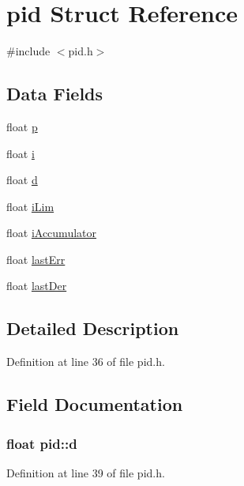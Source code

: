 \hypertarget{structpid}{\section{pid \-Struct \-Reference}
\label{structpid}
}


{\ttfamily \#include $<$pid.\-h$>$}

\subsection*{\-Data \-Fields}
\begin{DoxyCompactItemize}
\item 
float \hyperlink{structpid_a8281b69c68be641d7b0dcf0322b3715f}{p}
\item 
float \hyperlink{structpid_a97ebc09fc39d749940ebdc48926b8bb1}{i}
\item 
float \hyperlink{structpid_a1c4d7f2ca382af4be8d036cc36bd9c31}{d}
\item 
float \hyperlink{structpid_a2a3ee941dff64851693d27d04ece04f3}{i\-Lim}
\item 
float \hyperlink{structpid_afb7f8463c8cefe80b65db478c349a0b1}{i\-Accumulator}
\item 
float \hyperlink{structpid_ab61187c1e1bf8e3f6b09501992bd744f}{last\-Err}
\item 
float \hyperlink{structpid_ae79ee69d35b5daccddb71cbe270fbbd1}{last\-Der}
\end{DoxyCompactItemize}


\subsection{\-Detailed \-Description}


\-Definition at line 36 of file pid.\-h.



\subsection{\-Field \-Documentation}
\hypertarget{structpid_a1c4d7f2ca382af4be8d036cc36bd9c31}{
\subsubsection[{d}]{\setlength{\rightskip}{0pt plus 5cm}float {\bf pid\-::d}}}\label{structpid_a1c4d7f2ca382af4be8d036cc36bd9c31}


\-Definition at line 39 of file pid.\-h.

